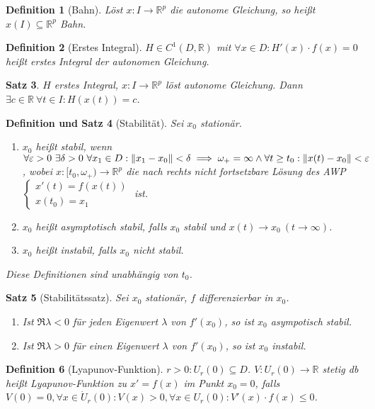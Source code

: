\documentclass[a4paper]{article}
\newcounter{Sec}
\theoremstyle{marginbreak}
\newtheorem{definition}{Definition}[Sec]
\newtheorem{satz}[definition]{Satz}
\newtheorem{defsatz}[definition]{Definition und Satz}
\newcommand{\R}{\mathbb{R}}
\begin{document}
	\begin{definition}[Bahn]
		Löst $x\colon I\to\R^p$ die autonome Gleichung, so heißt $x(I)\subseteq\R^p$ Bahn.
	\end{definition}
	\begin{definition}[Erstes Integral]
		$H\in C^1(D,\R)$ mit $\forall x\in D: H'(x)\cdot f(x)=0$ heißt erstes Integral der autonomen Gleichung.
	\end{definition}
	\begin{satz}
		$H$ erstes Integral, $x\colon I\to\R^p$ löst autonome Gleichung. Dann $\exists c\in\R~\forall t\in I: H(x(t)) = c$.
	\end{satz}
	\begin{defsatz}[Stabilität]
		Sei $x_0$ stationär.
		\begin{enumerate}[label=(\alph*)]
			\item $x_0$ heißt stabil, wenn $\forall\varepsilon>0~\exists\delta>0~\forall x_1\in D:
				\norm{x_1-x_0}<\delta\implies \omega_+=\infty\wedge\forall t\geq t_0:\norm{x(t)-x_0}<\varepsilon$,
				wobei $x\colon [t_0,\omega_+)\to\R^p$ die nach rechts nicht fortsetzbare Lösung des AWP
				$\begin{cases}x'(t)=f(x(t))\\x(t_0)=x_1\end{cases}$ ist.
			\item $x_0$ heißt asymptotisch stabil, falls $x_0$ stabil und $x(t)\to x_0~(t\to\infty)$.
			\item $x_0$ heißt instabil, falls $x_0$ nicht stabil.
		\end{enumerate}
		Diese Definitionen sind unabhängig von $t_0$.
	\end{defsatz}
	\begin{satz}[Stabilitätssatz] %
		Sei $x_0$ stationär, $f$ differenzierbar in $x_0$.
		\begin{enumerate}[label=(\alph*)]
			\item Ist $\Re\lambda<0$ für \emph{jeden}
				Eigenwert $\lambda$ von $f'(x_0)$, so ist $x_0$ asympotisch stabil.
			\item Ist $\Re\lambda>0$ für \emph{einen} Eigenwert $\lambda$ von $f'(x_0)$, so ist
				$x_0$ instabil.
		\end{enumerate}
	\end{satz}
	\begin{definition}[Lyapunov-Funktion]
		$r>0: U_r(0)\subseteq D$. $V\colon U_r(0)\to\R$ stetig db heißt Lyapunov-Funktion
		zu $x'=f(x)$ im Punkt $x_0=0$, falls $V(0)=0, \forall x\in \dot{U}_r(0): V(x)>0,
		\forall x\in U_r(0): V'(x)\cdot f(x)\leq 0$.
	\end{definition}
\end{document}
